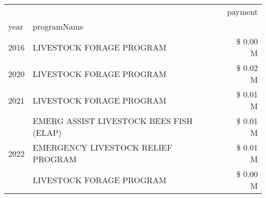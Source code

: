 \begin{tabular}{llr}
\toprule
 &  & payment \\
year & programName &  \\
\midrule
2016 & LIVESTOCK FORAGE PROGRAM & \$ 0.00 M \\
\cline{1-3}
2020 & LIVESTOCK FORAGE PROGRAM & \$ 0.02 M \\
\cline{1-3}
2021 & LIVESTOCK FORAGE PROGRAM & \$ 0.01 M \\
\cline{1-3}
\multirow[t]{3}{*}{2022} & EMERG ASSIST LIVESTOCK BEES FISH (ELAP) & \$ 0.01 M \\
 & EMERGENCY LIVESTOCK RELIEF PROGRAM & \$ 0.01 M \\
 & LIVESTOCK FORAGE PROGRAM & \$ 0.00 M \\
\cline{1-3}
\bottomrule
\end{tabular}
